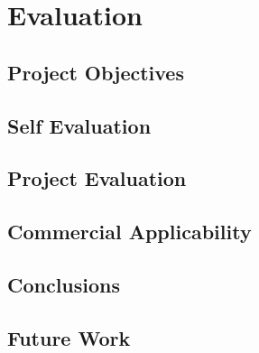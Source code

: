 \chapter[Evaluation]{Evaluation}

\section{Project Objectives}

\section{Self Evaluation}

\section{Project Evaluation}

\section{Commercial Applicability}

\section{Conclusions}

\section{Future Work}